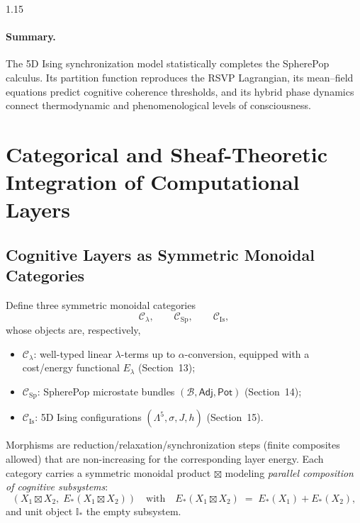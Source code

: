 \documentclass[12pt,a4paper]{article}
\begin{document}
\begin{spacing}{1.15}
\paragraph{Summary.}
The 5D Ising synchronization model
statistically completes the SpherePop calculus.
Its partition function reproduces the RSVP Lagrangian,
its mean–field equations predict cognitive coherence thresholds,
and its hybrid phase dynamics connect thermodynamic
and phenomenological levels of consciousness.

\section{Categorical and Sheaf-Theoretic Integration of Computational Layers}
\label{sec:cat-sheaf-integration}

\subsection{Cognitive Layers as Symmetric Monoidal Categories}

\begin{definition}
Define three symmetric monoidal categories
\[
\mathcal{C}_{\lambda}, \qquad
\mathcal{C}_{\mathrm{Sp}}, \qquad
\mathcal{C}_{\mathrm{Is}},
\]
whose objects are, respectively,
\begin{itemize}[leftmargin=1.2em]
  \item $\mathcal{C}_{\lambda}$: well-typed linear $\lambda$-terms up to $\alpha$-conversion, equipped with a cost/energy functional $E_{\lambda}$ (Section~13);
  \item $\mathcal{C}_{\mathrm{Sp}}$: SpherePop microstate bundles $(\mathcal{B},\mathsf{Adj},\mathsf{Pot})$ (Section~14);
  \item $\mathcal{C}_{\mathrm{Is}}$: 5D Ising configurations $(\Lambda^5,\sigma,J,h)$ (Section~15).
\end{itemize}
Morphisms are reduction/relaxation/synchronization steps (finite composites allowed) that are non-increasing for the corresponding layer energy.  
Each category carries a symmetric monoidal product $\boxtimes$ modeling \emph{parallel composition of cognitive subsystems}:
\[
(X_1 \boxtimes X_2,\; E_{*}(X_1 \boxtimes X_2))
\quad \text{with} \quad
E_{*}(X_1 \boxtimes X_2) \;=\; E_{*}(X_1)+E_{*}(X_2),
\]
and unit object $\mathbb{I}_{*}$ the empty subsystem.
\end{definition}


\end{spacing}
\end{document}
